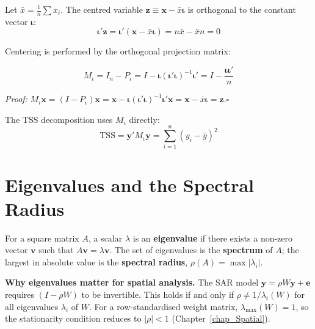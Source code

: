 Let $\bar{x} = \tfrac{1}{n}\sum x_i$. The centred variable
$\mathbf{z} \equiv \mathbf{x} - \bar{x}\boldsymbol{\iota}$ is orthogonal
to the constant vector $\boldsymbol{\iota}$:
\begin{equation}
  \boldsymbol{\iota}'\mathbf{z}
  = \boldsymbol{\iota}'(\mathbf{x} - \bar{x}\boldsymbol{\iota})
  = n\bar{x} - \bar{x}n = 0
\end{equation}

Centering is performed by the orthogonal projection matrix:

\begin{tcolorbox}[keyresult]
\begin{equation}
  M_\iota = I_n - P_\iota
          = I - \boldsymbol{\iota}(\boldsymbol{\iota}'\boldsymbol{\iota})^{-1}
            \boldsymbol{\iota}'
          = I - \frac{\boldsymbol{\iota}\boldsymbol{\iota}'}{n}
\end{equation}
\end{tcolorbox}

\noindent\textit{Proof:} $M_\iota\mathbf{x} = (I-P_\iota)\mathbf{x} =
\mathbf{x} - \boldsymbol{\iota}(\boldsymbol{\iota}'\boldsymbol{\iota})^{-1}
\boldsymbol{\iota}'\mathbf{x} = \mathbf{x} - \bar{x}\boldsymbol{\iota} =
\mathbf{z}$.\hfill$\square$

The TSS decomposition uses $M_\iota$ directly:
\begin{equation}
  \text{TSS} = \mathbf{y}'M_\iota\mathbf{y}
  = \sum_{i=1}^{n}(y_i - \bar{y})^2
\end{equation}


\section{Eigenvalues and the Spectral Radius}
\label{sec_Eigenvalues}

For a square matrix $A$, a scalar $\lambda$ is an \textbf{eigenvalue}
 if there exists a non-zero vector $\mathbf{v}$ such that
$A\mathbf{v} = \lambda\mathbf{v}$. The set of eigenvalues is the
\textbf{spectrum} of $A$; the largest in absolute value is the
\textbf{spectral radius}, $\rho(A) = \max|\lambda_i|$.

\noindent\textbf{Why eigenvalues matter for spatial analysis.}
The SAR model $\mathbf{y} = \rho W\mathbf{y} + \mathbf{e}$ requires
$(I - \rho W)$ to be invertible. This holds if and only if $\rho \neq
1/\lambda_i(W)$ for all eigenvalues $\lambda_i$ of $W$. For a
row-standardised weight matrix, $\lambda_{\max}(W) = 1$, so the
stationarity condition reduces to $|\rho| < 1$ (Chapter~\ref{chap_Spatial}).

\renewcommand\bibname{Further reading}
\begin{subappendices}


\end{subappendices}
